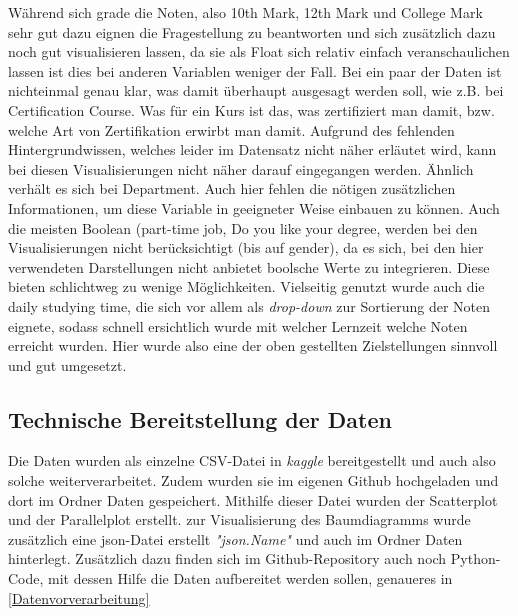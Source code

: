 \documentclass[usegeometry=true]{scrartcl}
\begin{document}
Während sich grade die Noten, also 10th Mark, 12th Mark und College Mark sehr gut dazu eignen die Fragestellung zu beantworten und sich zusätzlich dazu noch gut visualisieren lassen, da sie als Float sich relativ einfach veranschaulichen lassen ist dies bei anderen Variablen weniger der Fall. Bei ein paar der Daten ist nichteinmal genau klar, was damit überhaupt ausgesagt werden soll, wie z.B. bei Certification Course. Was für ein Kurs ist das,  was zertifiziert man damit, bzw. welche Art von Zertifikation erwirbt man damit. Aufgrund des fehlenden Hintergrundwissen, welches leider im Datensatz nicht näher erläutet wird, kann bei diesen Visualisierungen nicht näher darauf eingegangen werden. Ähnlich verhält es sich bei Department. Auch hier fehlen die nötigen zusätzlichen Informationen, um diese Variable in geeigneter Weise einbauen zu können.
Auch die meisten Boolean (part-time job, Do you like your degree,  werden bei den Visualisierungen nicht berücksichtigt (bis auf gender), da es sich, bei den hier verwendeten Darstellungen nicht anbietet boolsche Werte zu integrieren. Diese bieten schlichtweg zu wenige Möglichkeiten.
Vielseitig genutzt wurde auch die daily studying time, die sich vor allem als \textit{drop-down} zur Sortierung der Noten eignete, sodass schnell ersichtlich wurde mit welcher Lernzeit welche Noten erreicht wurden. 
Hier wurde also eine der oben gestellten Zielstellungen sinnvoll und gut umgesetzt.

\subsection{Technische Bereitstellung der Daten}
\label{Bereitstellung}

Die Daten wurden als einzelne CSV-Datei in \textit{kaggle} bereitgestellt und auch also solche weiterverarbeitet. 
Zudem wurden sie im eigenen Github hochgeladen und dort im Ordner Daten gespeichert. Mithilfe dieser Datei wurden der Scatterplot und der Parallelplot erstellt. zur Visualisierung des Baumdiagramms wurde zusätzlich eine json-Datei erstellt \textit{"json.Name"} und auch im Ordner Daten hinterlegt. Zusätzlich dazu finden sich im Github-Repository auch noch Python-Code, mit dessen Hilfe die Daten aufbereitet werden sollen, genaueres in \ref{Datenvorverarbeitung}
\end{document}
